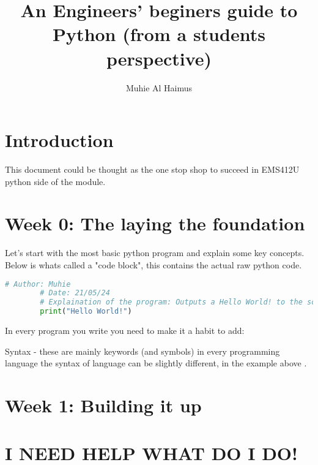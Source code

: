 \documentclass{article}
\title{An Engineers' beginers guide to Python (from a students perspective)}
\author{Muhie Al Haimus}
\begin{document}
	\maketitle
	\section{Introduction}
	This document could be thought as the one stop shop to succeed in EMS412U python side of the module.  
	 \section{Week 0: The laying the foundation}
	 Let's start with the most basic python program and explain some key concepts. Below is whats called a "code block", this contains the actual raw python code.
	 
	\begin{lstlisting}[language=Python]
		# Author: Muhie
		# Date: 21/05/24
		# Explaination of the program: Outputs a Hello World! to the screen
		print("Hello World!")
	\end{lstlisting}
	In every program you write you need to make it a habit to add:
	
	 Syntax - these are mainly keywords (and symbols) in every programming language the syntax of language can be slightly different, in the example above .
	 
	 
	 
	 \section{Week 1: Building it up}
	 
	
	\section{I NEED HELP WHAT DO I DO!}
	
\end{document}

